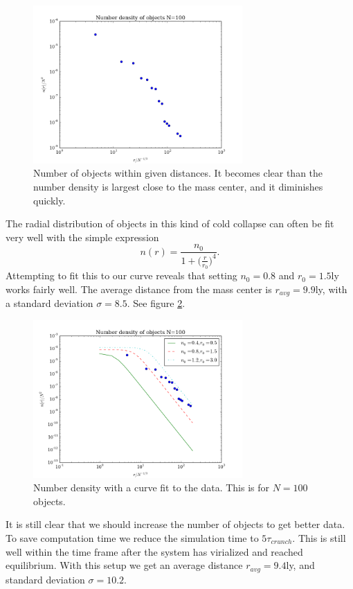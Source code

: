 \documentclass{aa}   %
\begin{document}
\begin{figure}[hbtp]
 \centering
 \includegraphics[width=80mm]{number_density_100_scaled.png}
 \caption[]{\label{number_density_100_scaled}
   Number of objects within given distances. It becomes clear than the number density is largest close to the mass center, and it diminishes quickly. 
 }
\end{figure}
The radial distribution of objects in this kind of cold collapse can often be fit very well with the simple expression
\begin{equation}
 n(r) = \frac{n_0}{1+ \big(\frac{r}{r_0}\big)^4}.
\end{equation}
Attempting to fit this to our curve reveals that setting $n_0 = 0.8$ and $r_0 = 1.5$ly works fairly well. The average distance from the mass center is $r_{avg} = 9.9$ly, with a standard deviation $\sigma = 8.5$.
See figure \ref{number_density_100_scaled_n}.
\begin{figure}[hbtp]
 \centering
 \includegraphics[width=80mm]{number_density_100_scaled_n.png}
 \caption[]{\label{number_density_100_scaled_n}
   Number density with a curve fit to the data. This is for $N=100$ objects.
 }
\end{figure}
It is still clear that we should increase the number of objects to get better data.
To save computation time we reduce the simulation time to $5\tau_{crunch}$. This is still well within the time frame after the system has virialized and reached equilibrium. With this setup we get an average distance $r_{avg} = 9.4$ly, and standard deviation $\sigma = 10.2$.
\end{document}
